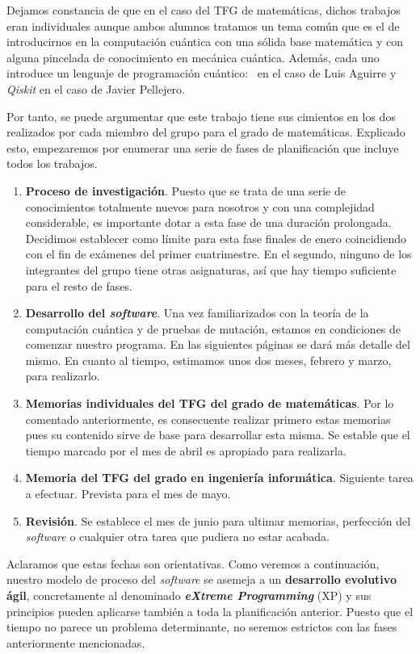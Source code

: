Dejamos constancia de que en el caso del TFG de matemáticas, dichos trabajos eran individuales aunque ambos alumnos tratamos un tema común que es el de introducirnos en la computación cuántica con una sólida base matemática y con alguna pincelada de conocimiento en mecánica cuántica. Además, cada uno introduce un lenguaje de programación cuántico: \qsh\ en el caso de Luis Aguirre y \textit{Qiskit} en el caso de Javier Pellejero.

Por tanto, se puede argumentar que este trabajo tiene sus cimientos en los dos realizados por cada miembro del grupo para el grado de matemáticas. Explicado esto, empezaremos por enumerar una serie de fases de planificación que incluye todos los trabajos.

\begin{enumerate}
\item \textbf{Proceso de investigación}. Puesto que se trata de una serie de conocimientos totalmente nuevos para nosotros y con una complejidad considerable, es importante dotar a esta fase de una duración prolongada. Decidimos establecer como límite para esta fase finales de enero coincidiendo con el fin de exámenes del primer cuatrimestre. En el segundo, ninguno de los integrantes del grupo tiene otras asignaturas, así que hay tiempo suficiente para el resto de fases.
\item \textbf{Desarrollo del \textit{software}}. Una vez familiarizados con la teoría de la computación cuántica y de pruebas de mutación, estamos en condiciones de comenzar nuestro programa. En las siguientes páginas se dará más detalle del mismo. En cuanto al tiempo, estimamos unos dos meses, febrero y marzo, para realizarlo.
\item \textbf{Memorias individuales del TFG del grado de matemáticas}. Por lo comentado anteriormente, es consecuente realizar primero estas memorias pues su contenido sirve de base para desarrollar esta misma. Se estable que el tiempo marcado por el mes de abril es apropiado para realizarla.
\item \textbf{Memoria del TFG del grado en ingeniería informática}. Siguiente tarea a efectuar. Prevista para el mes de mayo.
\item \textbf{Revisión}. Se establece el mes de junio para ultimar memorias, perfección del \textit{software} o cualquier otra tarea que pudiera no estar acabada.
\end{enumerate}

Aclaramos que estas fechas son orientativas. Como veremos a continuación, nuestro modelo de proceso del \textit{software} se asemeja a un \textbf{desarrollo evolutivo ágil}, concretamente al denominado \textbf{\textit{eXtreme Programming}} (XP) y sus principios pueden aplicarse también a toda la planificación anterior. Puesto que el tiempo no parece un problema determinante, no seremos estrictos con las fases anteriormente mencionadas.

